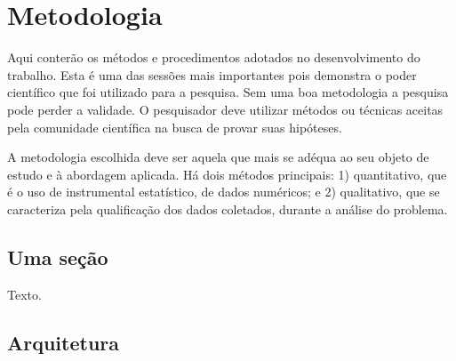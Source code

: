 \chapter{Metodologia}

Aqui conterão os métodos e procedimentos adotados no desenvolvimento do
trabalho. Esta é uma das sessões mais importantes pois demonstra o poder
científico que foi utilizado para a pesquisa. Sem uma boa metodologia a
pesquisa pode perder a validade. O pesquisador deve utilizar métodos ou
técnicas aceitas pela comunidade científica na busca de provar suas hipóteses.

A metodologia escolhida deve ser aquela que mais se adéqua ao seu objeto de
estudo e à abordagem aplicada. Há dois métodos principais: 1) quantitativo, que
é o uso de instrumental estatístico, de dados numéricos; e 2) qualitativo, que
se caracteriza pela qualificação dos dados coletados, durante a análise do
problema.

\section{Uma seção}
Texto.

\section{Arquitetura}

